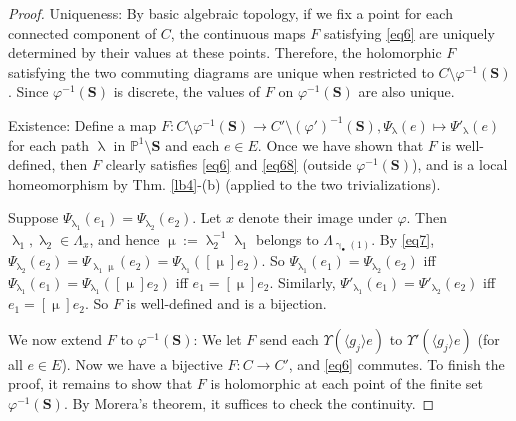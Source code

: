 \documentclass[11pt,b5paper,notitlepage]{article}
\theoremstyle{definition}
\theoremstyle{plain}
\newcommand{\bk}[1]{\langle {#1}\rangle}
\newcommand{\blt}{\bullet}
\newcommand{\Pbb}{\mathbb P}
\newcommand{\Sbf}{\mathbf{S}}
\numberwithin{equation}{subsection}
\begin{document}
\begin{proof}
Uniqueness: By basic algebraic topology, if we fix a point for each connected component of $C$, the  continuous maps $F$ satisfying \eqref{eq6} are uniquely determined by their values at these points. Therefore, the holomorphic $F$ satisfying the two commuting diagrams are unique when  restricted to $C\setminus\varphi^{-1}(\Sbf)$. Since $\varphi^{-1}(\Sbf)$ is discrete, the values of $F$ on 	$\varphi^{-1}(\Sbf)$ are also unique.
	
Existence: Define a map $F:C\setminus\varphi^{-1}(\Sbf)\rightarrow C'\setminus(\varphi')^{-1}(\Sbf),\Psi_\uplambda(e)\mapsto \Psi'_\uplambda(e)$ for each path $\uplambda$ in $\Pbb^1\setminus\Sbf$ and each $e\in E$. Once we have shown that $F$ is well-defined, then $F$ clearly satisfies \eqref{eq6} and \eqref{eq68} (outside $\varphi^{-1}(\Sbf)$), and is a local homeomorphism by Thm. \ref{lb4}-(b) (applied to the two trivializations).

Suppose $\Psi_{\uplambda_1}(e_1)=\Psi_{\uplambda_2}(e_2)$. Let $x$ denote their image under $\varphi$. Then $\uplambda_1,\uplambda_2\in\Lambda_x$, and hence $\upmu:=\uplambda_2^{-1}\uplambda_1$ belongs to $\Lambda_{\upgamma_\blt(1)}$. By \eqref{eq7}, $\Psi_{\uplambda_2}(e_2)=\Psi_{\uplambda_1\upmu}(e_2)=\Psi_{\uplambda_1}([\upmu]e_2)$. So $\Psi_{\uplambda_1}(e_1)=\Psi_{\uplambda_2}(e_2)$ iff $\Psi_{\uplambda_1}(e_1)=\Psi_{\uplambda_1}([\upmu]e_2)$ iff $e_1=[\upmu]e_2$. Similarly, $\Psi'_{\uplambda_1}(e_1)=\Psi'_{\uplambda_2}(e_2)$ iff $e_1=[\upmu]e_2$. So $F$ is well-defined and is a bijection.


We now extend $F$ to $\varphi^{-1}(\Sbf)$: We let $F$ send each $\Upsilon(\bk{g_j}e)$ to $\Upsilon'(\bk{g_j}e)$ (for all $e\in E$). Now we have a bijective $F:C\rightarrow C'$, and \eqref{eq6} commutes. To finish the proof, it remains to show that $F$ is holomorphic at each point of the finite set $\varphi^{-1}(\Sbf)$. By Morera's theorem, it suffices to check the continuity.


\end{proof}
\end{document}
